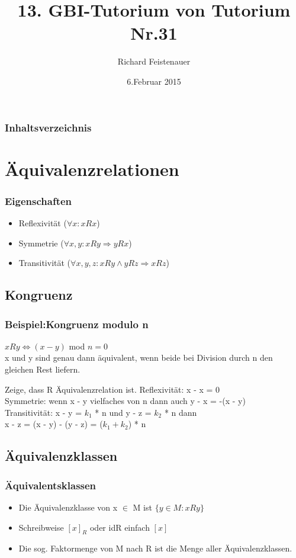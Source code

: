 \documentclass{beamer}
\author{Richard Feistenauer}
\title{13. GBI-Tutorium von Tutorium Nr.31}
\date{6.Februar 2015}
\begin{document}
\begin {frame}
	\titlepage
\end {frame}

\begin {frame}
	\frametitle {Inhaltsverzeichnis}
	\tableofcontents
\end {frame}

\section{Äquivalenzrelationen}
\begin{frame}
	\frametitle{Eigenschaften}
	\begin{block}{}
		\begin{itemize}
			\pause
			\item Reflexivität ($\forall x : xRx$)
			\item Symmetrie ($\forall x,y : xRy \Rightarrow yRx$)
			\item Transitivität ($\forall x,y,z : xRy \land yRz \Rightarrow xRz$)
		\end{itemize}
	\end{block}
\end{frame}

\subsection{Kongruenz}
\begin{frame}
	\frametitle{Beispiel:Kongruenz modulo n}
	\begin{block}{}
		$xRy \Leftrightarrow (x - y)$ mod $n = 0$\\
		\pause
		\bigskip
		x und y sind genau dann äquivalent, wenn beide bei Division durch n den gleichen Rest liefern.\\
		\bigskip
		\begin{block} {Zeige, dass R Äquivalenzrelation ist.}
		\pause
		Reflexivität: x - x = 0\\
		Symmetrie: wenn x - y vielfaches von n dann auch y - x = -(x - y)\\
		Transitivität: x - y = $k_1$ * n und y - z = $k_2$ * n dann\\
		x - z = (x - y) - (y - z) = ($k_1 + k_2$) * n
		\end{block}
	\end{block}
\end{frame}

\subsection{Äquivalenzklassen}
\begin{frame}
	\frametitle{Äquivalentsklassen}
	\begin{itemize}
		\item Die Äquivalenzklasse von x $\in$ M ist $\{ y \in M : xRy \}$
		\item Schreibweise $[x]_R$ oder idR einfach $[x]$
		\item Die sog. Faktormenge von M nach R ist die Menge aller Äquivalenzklassen.
	\end{itemize}
\end{frame}
\end{document}
